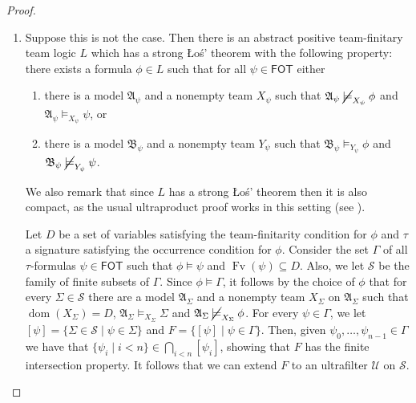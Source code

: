 \documentclass[a4paper]{amsart}
\theoremstyle{definition}
\theoremstyle{remark}
\newcommand{\A}{\mathcal{A}}
\newcommand{\B}{\mathcal{B}}
\newcommand{\U}{\mathcal{U}}
\renewcommand{\S}{\mathcal{S}}
\DeclareMathOperator{\dom}{dom}
\DeclareMathOperator{\Fv}{Fv}
\newcommand{\cneg}{\mathord{\dot{\sim}}}
\newcommand\fot{\mathsf{FOT}}
\newcommand\nmodels{\mathbin{\cancel{\models}}}
\newcommand{\Y}{\mathcal{Y}}
\newcommand{\X}{\mathcal{X}}
\theoremstyle{definition}
\renewcommand{\A}{\mathfrak{A}}
\renewcommand{\B}{\mathfrak{B}}
\newcommand{\f}{\mathcal{f}}
\newcommand{\g}{\mathcal{g}}
\begin{document}
\begin{proof}
\begin{enumerate}
        The model $\B_{n+1}$, the set $\Y_{n+1}$ and the maps $\j_n$ and $\f_{n+1}$ are constructed in a similar manner, using $\B_n$, $\Y_n$, $\A_{n+1}$, $\X_{n+1}$ and $\g_n$.

        In the end, we let $\A_\omega = \lim_{i<\omega}\A_i$, $X_\omega = \i_\omega(X_0)$, where $\i_\omega$ is the direct limit map $\A_0\to\A_\omega$ of the system $(\A_i)_{i<\omega}$, and $\B_\omega = \lim_{i<\omega}\B_i$ and $Y_\omega = \j_\omega(Y_0)$, where $\j_\omega$ is the direct limit map $\B_0\to\B_\omega$ of the system $(\B_i)_{i<\omega}$. Now, since $L$ has direct limits, we have $\A_\omega\models_{X_\omega}\cneg\phi$ and $\B_\omega\models_{Y_\omega}\phi$. But as both $(\A_i)_{i<\omega}$ and $(\B_i)_{i<\omega}$ are cofinal in the directed system, we must have $\A_\omega\cong\B_\omega$ and furthermore, the isomorphism maps $X_\omega$ to $Y_\omega$, which is impossible.

        \item Suppose this is not the case. Then there is an abstract positive team-finitary team logic $L$ which has a strong Łoś' theorem with the following property: there exists a formula $\phi\in L$ such that for all $\psi\in \fot$ either
        \begin{enumerate}
            \item there is a model $\A_\psi$ and a nonempty team $X_\psi$ such that $\A_\psi\nmodels_{X_\psi} \phi$ and $ \A_\psi\models_{X_\psi} \psi$, or
            \item there is a model $\B_\psi$ and a nonempty team $Y_\psi$ such that $\B_\psi\models_{Y_\psi} \phi$ and  $\B_\psi\nmodels_{Y_\psi} \psi$.
        \end{enumerate}
        We also remark that since $L$ has a strong Łoś' theorem then it is also compact, as the usual ultraproduct proof works in this setting (see \cite[Theorem 3.14]{puljujärvi2022compactness}).

        Let $D$ be a set of variables satisfying the team-finitarity condition for $\phi$ and $\tau$ a signature satisfying the occurrence condition for $\phi$. Consider the set $\Gamma$ of all  $\tau$-formulas $\psi\in\fot$ such that $\phi\models\psi$ and $\Fv(\psi)\subseteq D$. Also, we let $\S$ be the family of finite subsets of $\Gamma$. Since $\phi\models \Gamma$, it follows by the choice of $\phi$ that for every $\Sigma\in \S$ there are a model $\A_\Sigma$ and a nonempty team $X_\Sigma$ on $\A_\Sigma$ such that $\dom(X_\Sigma)=D$,  $\A_\Sigma\models_{X_\Sigma} \Sigma$ and $\A_\Sigma\nmodels_{X_\Sigma} \phi$. For every $\psi\in \Gamma$, we let  $[\psi]=\{ \Sigma\in \S \mid \psi \in \Sigma \}$ and $F=\{[\psi] \mid \psi \in \Gamma  \}$.   Then, given  $\psi_0,\dots,\psi_{n-1}\in \Gamma$ we have that $\{ \psi_i \mid i<n\}\in \bigcap_{i<n}[\psi_i]$, showing that $F$ has the finite intersection property. It follows that we can extend $F$ to an ultrafilter $\U$ on $\S$. 
    

\end{enumerate}
\end{proof}
\end{document}

